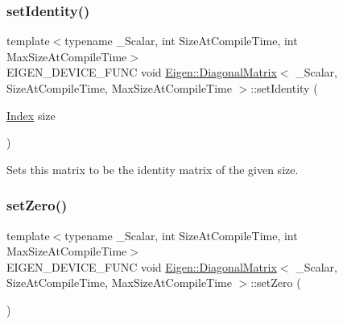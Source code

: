 \subsubsection{\texorpdfstring{setIdentity()}{setIdentity()}\hspace{0.1cm}{\footnotesize\ttfamily [2/2]}}
{\footnotesize\ttfamily template$<$typename \+\_\+\+Scalar, int Size\+At\+Compile\+Time, int Max\+Size\+At\+Compile\+Time$>$ \\
E\+I\+G\+E\+N\+\_\+\+D\+E\+V\+I\+C\+E\+\_\+\+F\+U\+NC void \mbox{\hyperlink{class_eigen_1_1_diagonal_matrix}{Eigen\+::\+Diagonal\+Matrix}}$<$ \+\_\+\+Scalar, Size\+At\+Compile\+Time, Max\+Size\+At\+Compile\+Time $>$\+::set\+Identity (\begin{DoxyParamCaption}\item[{\mbox{\hyperlink{struct_eigen_1_1_eigen_base_a554f30542cc2316add4b1ea0a492ff02}{Index}}}]{size }\end{DoxyParamCaption})\hspace{0.3cm}{\ttfamily [inline]}}

Sets this matrix to be the identity matrix of the given size. \mbox{\label{class_eigen_1_1_diagonal_matrix_a4d9b1c1fd53e4bee2e94098c8378db8e}} 
\subsubsection{\texorpdfstring{setZero()}{setZero()}\hspace{0.1cm}{\footnotesize\ttfamily [1/2]}}
{\footnotesize\ttfamily template$<$typename \+\_\+\+Scalar, int Size\+At\+Compile\+Time, int Max\+Size\+At\+Compile\+Time$>$ \\
E\+I\+G\+E\+N\+\_\+\+D\+E\+V\+I\+C\+E\+\_\+\+F\+U\+NC void \mbox{\hyperlink{class_eigen_1_1_diagonal_matrix}{Eigen\+::\+Diagonal\+Matrix}}$<$ \+\_\+\+Scalar, Size\+At\+Compile\+Time, Max\+Size\+At\+Compile\+Time $>$\+::set\+Zero (\begin{DoxyParamCaption}{ }\end{DoxyParamCaption})\hspace{0.3cm}{\ttfamily [inline]}}

